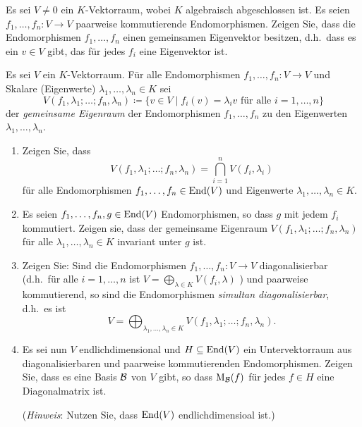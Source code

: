 \documentclass[a4paper,10pt]{scrartcl}
\begin{document}


\begin{question}
  Es sei $V \neq 0$ ein $K$-Vektorraum, wobei $K$ algebraisch abgeschlossen ist.
  Es seien $f_1, \dotsc, f_n \colon V \to V$ paarweise kommutierende Endomorphismen.
  Zeigen Sie, dass die Endomorphismen $f_1, \dotsc, f_n$ einen gemeinsamen Eigenvektor besitzen, d.h.\ dass es ein $v \in V$ gibt, das für jedes $f_i$ eine Eigenvektor ist.
\end{question}


\begin{question}
  Es sei $V$ ein $K$-Vektorraum.
  Für alle Endomorphismen $f_1, \dotsc, f_n \colon V  \to V$ und Skalare (Eigenwerte) \mbox{$\lambda_1, \dotsc, \lambda_n \in K$} sei
  \[
              V(f_1, \lambda_1; \dotsc; f_n, \lambda_n)
    \coloneqq \{ v \in V \mid \text{$f_i(v) = \lambda_i v$ für alle $i = 1, \dotsc, n$} \}
  \]
  der \emph{gemeinsame Eigenraum} der Endomorphismen $f_1, \dotsc, f_n$ zu den Eigenwerten $\lambda_1, \dotsc, \lambda_n$.
  \begin{enumerate}[leftmargin=*]
    \item
      Zeigen Sie, dass
      \[
          V(f_1, \lambda_1; \dotsc; f_n, \lambda_n)
        = \bigcap_{i=1}^n V(f_i, \lambda_i)
      \]
      für alle Endomorphismen $f_1, \dotsc, f_n \in \operatorname{End}(V)$ und Eigenwerte $\lambda_1, \dotsc, \lambda_n \in K$.
    \item
      Es seien $f_1, \dotsc, f_n, g \in \operatorname{End}(V)$ Endomorphismen, so dass $g$ mit jedem $f_i$ kommutiert.
      Zeigen sie, dass der gemeinsame Eigenraum $V(f_1, \lambda_1; \dots; f_n, \lambda_n)$ für alle $\lambda_1, \dotsc, \lambda_n \in K$ invariant unter $g$ ist.
    \item
      Zeigen Sie: Sind die Endomorphismen $f_1, \dotsc, f_n \colon V \to V$ diagonalisierbar (d.h.\ für alle $i = 1, \dotsc, n$ ist $V = \bigoplus_{\lambda \in K} V(f_i, \lambda)$ ) und paarweise kommutierend, so sind die Endomorphismen \emph{simultan diagonalisierbar}, d.h.\ es ist
      \[
          V
        = \bigoplus_{\lambda_1, \dotsc, \lambda_n \in K}  V(f_1, \lambda_1; \dotsc; f_n, \lambda_n).
      \]
    \item
      Es sei nun $V$ endlichdimensional und $H \subseteq \operatorname{End}(V)$ ein Untervektorraum aus diagonalisierbaren und paarweise kommutierenden Endomorphismen.
      Zeigen Sie, dass es eine Basis $\mathcal{B}$ von $V$ gibt, so dass $\operatorname{M}_{\mathcal{B}}(f)$ für jedes $f \in H$ eine Diagonalmatrix ist.
      
      (\emph{Hinweis}:
       Nutzen Sie, dass $\operatorname{End}(V)$ endlichdimensioal ist.)
  \end{enumerate}
\end{question}
\end{document}
